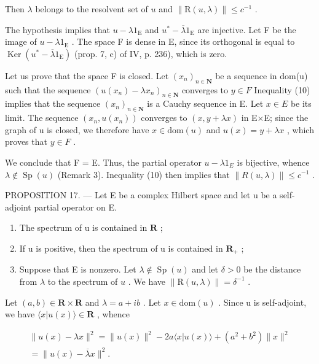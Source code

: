 Then \(\lambda\) belongs to the resolvent set of \(u\) and \(\| \mathrm{R}(u,\lambda)\| \leqslant c^{-1}\) .

The hypothesis implies that \(u - \lambda 1_{\mathrm{E}}\) and \(u^{*} - \overline{\lambda} 1_{\mathrm{E}}\) are injective. Let F be the image of \(u - \lambda 1_{\mathrm{E}}\) . The space F is dense in E, since its orthogonal is equal to \(\operatorname{Ker}(u^{*} - \overline{\lambda} 1_{\mathrm{E}})\) (prop. 7, c) of IV, p. 236), which is zero.

Let us prove that the space F is closed. Let \((x_{n})_{n\in\mathbf{N}}\) be a sequence in dom(u) such that the sequence \((u(x_{n})-\lambda x_{n})_{n\in\mathbf{N}}\) converges to \(y\in F\) Inequality (10) implies that the sequence \((x_{n})_{n\in\mathbf{N}}\) is a Cauchy sequence in E. Let \(x\in E\) be its limit. The sequence \((x_{n},u(x_{n}))\) converges to \((x,y+\lambda x)\) in E×E; since the graph of u is closed, we therefore have \(x\in\text{dom}(u)\) and \(u(x)=y+\lambda x\) , which proves that \(y\in F\) .

We conclude that F = E. Thus, the partial operator \(u - \lambda1_{E}\) is bijective, whence \(\lambda \notin \operatorname{Sp}(u)\) (Remark 3). Inequality (10) then implies that \(\|R(u, \lambda)\| \leqslant c^{-1}\) .

PROPOSITION 17. — Let E be a complex Hilbert space and let u be a self-adjoint partial operator on E.

\begin{enumerate}
\def\labelenumi{\alph{enumi})}
\item
  The spectrum of u is contained in \(\mathbf{R}\) ;
\item
  If u is positive, then the spectrum of u is contained in \(\mathbf{R}_{+}\) ;
\item
  Suppose that E is nonzero. Let \(\lambda \notin \operatorname{Sp}(u)\) and let \(\delta > 0\) be the distance from \(\lambda\) to the spectrum of \(u\) . We have \(\| \mathrm{R}(u, \lambda) \| = \delta^{-1}\) .
\end{enumerate}

Let \((a,b)\in\mathbf{R}\times\mathbf{R}\) and \(\lambda=a+ib\) . Let \(x\in\mathrm{dom}(u)\) . Since u is self-adjoint, we have \(\langle x|u(x)\rangle\in\mathbf{R}\) , whence

\[
\begin{array}{r} \| u (x) - \lambda x \| ^ {2} = \| u (x) \| ^ {2} - 2 a \langle x | u (x) \rangle + (a ^ {2} + b ^ {2}) \| x \| ^ {2} \\ = \| u (x) - \overline {{\lambda}} x \| ^ {2}. \end{array}
\]

